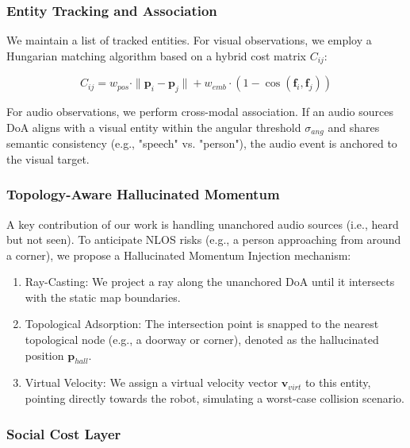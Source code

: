 \subsubsection{Entity Tracking and
    Association}\label{entity-tracking-and-association}

We maintain a list of tracked entities. For visual observations, we
employ a Hungarian matching algorithm based on a hybrid cost matrix
\(C_{ij}\):

\begin{equation}
    C_{ij} = w_{pos} \cdot \|\mathbf{p}_i - \mathbf{p}_j\| + w_{emb} \cdot (1 - \cos(\mathbf{f}_i, \mathbf{f}_j))
\end{equation}

For audio observations, we perform cross-modal association. If an audio
source\textquotesingle s DoA aligns with a visual entity within the
angular threshold \(\sigma_{ang}\) and shares semantic consistency
(e.g., "speech" vs. "person"), the audio event is anchored to the visual
target.

\subsubsection{Topology-Aware Hallucinated
    Momentum}\label{topology-aware-hallucinated-momentum}

A key contribution of our work is handling unanchored audio sources
(i.e., heard but not seen). To anticipate NLOS risks (e.g., a person
approaching from around a corner), we propose a Hallucinated Momentum
Injection mechanism:

\begin{enumerate}
    \def\labelenumi{\arabic{enumi}.}
    \item
          Ray-Casting: We project a ray along the unanchored DoA until it
          intersects with the static map boundaries.
    \item
          Topological Adsorption: The intersection point is snapped to the
          nearest topological node (e.g., a doorway or corner), denoted as the
          hallucinated position \(\mathbf{p}_{hall}\).
    \item
          Virtual Velocity: We assign a virtual velocity vector
          \(\mathbf{v}_{virt}\) to this entity, pointing directly towards the
          robot, simulating a worst-case collision scenario.
\end{enumerate}

\subsubsection{Social Cost Layer}\label{social-cost-layer}

